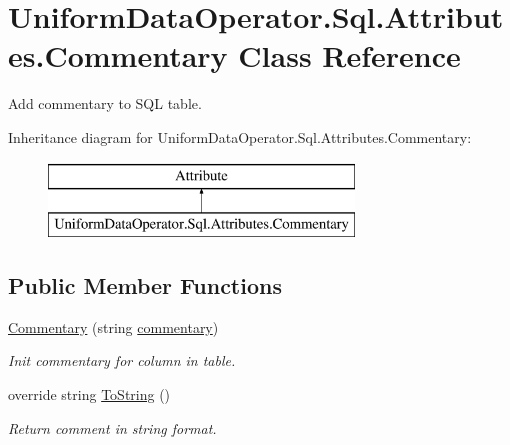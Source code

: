 \hypertarget{class_uniform_data_operator_1_1_sql_1_1_attributes_1_1_commentary}{}\section{Uniform\+Data\+Operator.\+Sql.\+Attributes.\+Commentary Class Reference}
\label{class_uniform_data_operator_1_1_sql_1_1_attributes_1_1_commentary}


Add commentary to S\+QL table.  


Inheritance diagram for Uniform\+Data\+Operator.\+Sql.\+Attributes.\+Commentary\+:\begin{figure}[H]
\begin{center}
\leavevmode
\includegraphics[height=2.000000cm]{d7/d35/class_uniform_data_operator_1_1_sql_1_1_attributes_1_1_commentary}
\end{center}
\end{figure}
\subsection*{Public Member Functions}
\begin{DoxyCompactItemize}
\item 
\mbox{\hyperlink{class_uniform_data_operator_1_1_sql_1_1_attributes_1_1_commentary_a32175c17c1db206f170ec84a8e83abd7}{Commentary}} (string \mbox{\hyperlink{class_uniform_data_operator_1_1_sql_1_1_attributes_1_1_commentary_a5cb463ba92cc10199d1a8ffb8c8729fd}{commentary}})
\begin{DoxyCompactList}\small\item\em Init commentary for column in table. \end{DoxyCompactList}\item 
override string \mbox{\hyperlink{class_uniform_data_operator_1_1_sql_1_1_attributes_1_1_commentary_a254d1f32018f1686b615a9ced5c0b1d5}{To\+String}} ()
\begin{DoxyCompactList}\small\item\em Return comment in string format. \end{DoxyCompactList}\end{DoxyCompactItemize}
